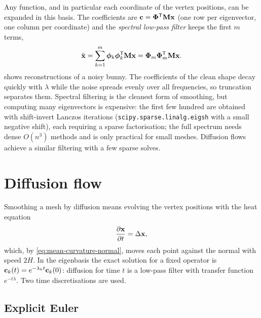 Any function, and in particular each coordinate of the vertex positions, can be expanded in this
basis. The coefficients are $\mathbf{c}=\boldsymbol{\Phi}^{\mathsf{T}}\mathbf{M}\mathbf{x}$ (one row per eigenvector, one column per
coordinate) and the \emph{spectral low-pass filter} keeps the first $m$ terms,
\begin{equation}
\tilde{\mathbf{x}}=\sum_{k=1}^{m}\boldsymbol{\phi}_k\boldsymbol{\phi}_k^{\mathsf{T}}\mathbf{M}\mathbf{x}=\boldsymbol{\Phi}_m\boldsymbol{\Phi}_m^{\mathsf{T}}\mathbf{M}\mathbf{x} .
\end{equation}
 shows reconstructions of a noisy bunny. The coefficients of the clean shape
decay quickly with $\lambda$ while the noise spreads evenly over all frequencies, so truncation
separates them. Spectral filtering is the cleanest form of smoothing, but computing many
eigenvectors is expensive: the first few hundred are obtained with shift-invert Lanczos iterations
(\texttt{scipy.sparse.linalg.eigsh} with a small negative shift), each requiring a sparse
factorisation; the full spectrum needs dense $O(n^3)$ methods and is only practical for small
meshes. Diffusion flows achieve a similar filtering with a few sparse solves.


\section{Diffusion flow}

Smoothing a mesh by diffusion means evolving the vertex positions with the heat equation
\begin{equation}
\frac{\partial\mathbf{x}}{\partial t}=\Delta\mathbf{x} ,
\end{equation}
which, by \eqref{eq:mean-curvature-normal}, moves each point against the normal with speed $2H$.
In the eigenbasis the exact solution for a fixed operator is $\mathbf{c}_k(t)=e^{-\lambda_kt}\mathbf{c}_k(0)$:
diffusion for time $t$ is a low-pass filter with transfer function $e^{-t\lambda}$. Two time
discretisations are used.

\subsection{Explicit Euler}

